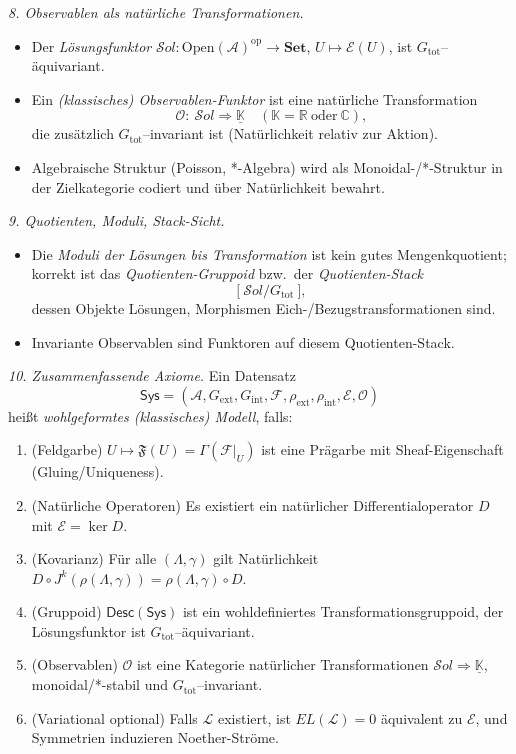 \documentclass[10pt, letterpaper]{article}
\newcommand{\R}{\mathbb{R}}
\newcommand{\C}{\mathbb{C}}
\begin{document}
\bigskip
\emph{8. Observablen als natürliche Transformationen.}
\begin{itemize}
\item Der \emph{Lösungsfunktor} $\mathcal S ol:\mathrm{Open}(\mathcal A)^{\mathrm{op}}\to\mathbf{Set}$,
$U\mapsto \mathcal E(U)$, ist $G_{\mathrm{tot}}$–äquivariant.
\item Ein \emph{(klassisches) Observablen-Funktor} ist eine natürliche Transformation
\[
\mathcal O:\ \mathcal S ol \Longrightarrow \underline{\mathbb K}
\quad(\mathbb K=\R\ \text{oder}\ \C),
\]
die zusätzlich $G_{\mathrm{tot}}$–invariant ist (Natürlichkeit relativ zur Aktion).
\item Algebraische Struktur (Poisson, *-Algebra) wird als Monoidal-/*-Struktur in der Zielkategorie codiert und über Natürlichkeit bewahrt.
\end{itemize}

\bigskip
\emph{9. Quotienten, Moduli, Stack-Sicht.}
\begin{itemize}
\item Die \emph{Moduli der Lösungen bis Transformation} ist kein gutes Mengenkquotient; korrekt ist das \emph{Quotienten-Gruppoid} bzw.\ der \emph{Quotienten-Stack}
\[
\big[\ \mathcal S ol / G_{\mathrm{tot}}\ \big],
\]
dessen Objekte Lösungen, Morphismen Eich-/Bezugstransformationen sind.
\item Invariante Observablen sind Funktoren auf diesem Quotienten-Stack.
\end{itemize}

\bigskip
\emph{10. Zusammenfassende Axiome.}
Ein Datensatz
\[
\mathsf{Sys}=(\mathcal A, G_{\mathrm{ext}}, G_{\mathrm{int}}, \mathcal F,
\rho_{\mathrm{ext}},\rho_{\mathrm{int}}, \mathcal E, \mathcal O)
\]
heißt \emph{wohlgeformtes (klassisches) Modell}, falls:
\begin{enumerate}
\item (Feldgarbe) $U\mapsto \mathfrak F(U)=\Gamma(\mathcal F|_U)$ ist eine Prägarbe mit Sheaf-Eigenschaft (Gluing/Uniqueness).
\item (Natürliche Operatoren) Es existiert ein natürlicher Differentialoperator $D$ mit $\mathcal E=\ker D$.
\item (Kovarianz) Für alle $(\Lambda,\gamma)$ gilt Natürlichkeit
$D\circ J^k(\rho(\Lambda,\gamma))=\rho(\Lambda,\gamma)\circ D$.
\item (Gruppoid) $\mathsf{Desc}(\mathsf{Sys})$ ist ein wohldefiniertes Transformationsgruppoid, der Lösungsfunktor ist $G_{\mathrm{tot}}$–äquivariant.
\item (Observablen) $\mathcal O$ ist eine Kategorie natürlicher Transformationen 
$\mathcal S ol\Rightarrow\underline{\mathbb K}$, monoidal/*-stabil und $G_{\mathrm{tot}}$–invariant.
\item (Variational optional) Falls $\mathcal L$ existiert, ist $EL(\mathcal L)=0$ äquivalent zu $\mathcal E$, und Symmetrien induzieren Noether-Ströme.
\end{enumerate}
\end{document}
